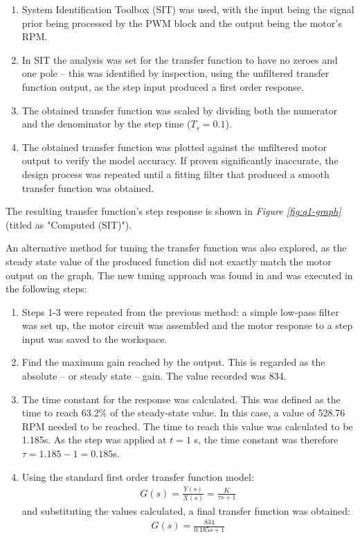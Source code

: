 \documentclass[11pt, onecolumn]{article}
\begin{document}
\begin{enumerate}
    \item System Identification Toolbox (SIT) was used, with the input being the signal prior being processed by the PWM block and the output being the motor's RPM.
    \item In SIT the analysis was set for the transfer function to have no zeroes and one pole – this was identified by inspection, using the unfiltered transfer function output, as the step input produced a first order response.
    \item The obtained transfer function was scaled by dividing both the numerator and the denominator by the step time ($T_s = 0.1$).
    \item The obtained transfer function was plotted against the unfiltered motor output to verify the model accuracy. If proven significantly inaccurate, the design process was repeated until a fitting filter that produced a smooth transfer function was obtained.
\end{enumerate}
\par The resulting transfer function's step response is shown in \textit{Figure \ref{fig:q1-graph}} (titled as "Computed (SIT)"). \\\:
\par An alternative method for tuning the transfer function was also explored, as the steady state value of the produced function did not exactly match the motor output on the graph. The new tuning approach was found in \cite{umichControlTutorials} and was executed in the following steps:
\begin{enumerate}
    \item Steps 1-3 were repeated from the previous method: a simple low-pass filter was set up, the motor circuit was assembled and the motor response to a step input was saved to the workspace.
    \item Find the maximum gain reached by the output. This is regarded as the absolute – or steady state – gain. The value recorded was 834.
    \item The time constant for the response was calculated. This was defined as the time to reach 63.2\% of the steady-state value. In this case, a value of 528.76 RPM needed to be reached. The time to reach this value was calculated to be 1.185s. As the step was applied at $t=1$ s, the time constant was therefore $\tau = 1.185 - 1 = 0.185$s.
    \item Using the standard first order transfer function model:
          \begin{align*}
              G(s)=\frac{Y(s)}{X(s)}=\frac{K}{\tau s + 1}
          \end{align*}
          and substituting the values calculated, a final transfer function was obtained:
          \begin{align*}
              G(s)=\frac{834}{0.185s + 1}
          \end{align*}
\end{enumerate}
\end{document}
